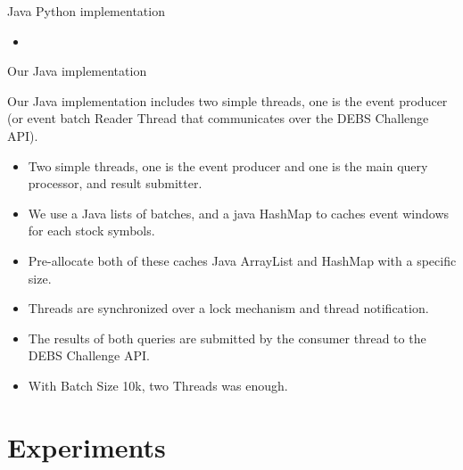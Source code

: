 \documentclass[9pt]{beamer}
\begin{document}
\begin{frame}[fragile]{Java Python implementation }
    
    \begin{itemize}
        \item 
    \end{itemize}


    
\end{frame}


\begin{frame}[fragile]{Our Java implementation }
    
    Our Java implementation includes two simple threads, one is the event producer (or event batch Reader Thread that communicates over the DEBS Challenge API). 
    \begin{itemize}
        \item Two simple threads, one is the event producer and one is the main query processor,  and result submitter. 
        \item We use a Java lists of batches, and a java HashMap to caches event windows for each stock symbols. 
        \item Pre-allocate both of these caches Java ArrayList and HashMap with a specific size.
        \item Threads are synchronized over a lock mechanism and thread notification.
        \item The results of both queries are submitted by the consumer thread to the DEBS Challenge API.
        \item With Batch Size 10k, two Threads was enough. 
    \end{itemize}


    
\end{frame}





\section{Experiments}





\end{document}
